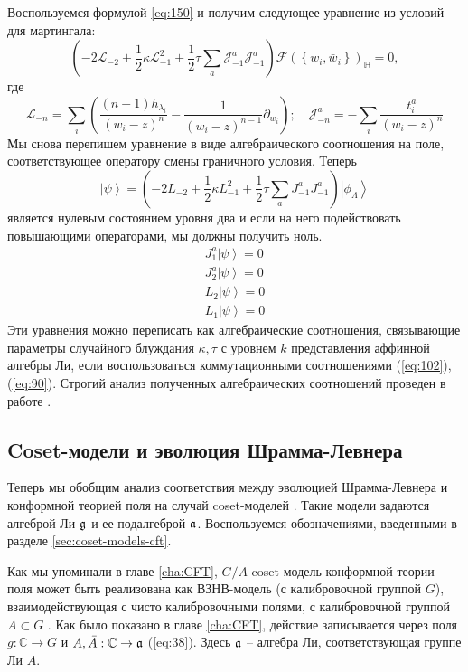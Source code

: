 Воспользуемся формулой \eqref{eq:150} и получим следующее уравнение из условий для мартингала:
\begin{equation}
  \left(-2 \mathcal{L}_{-2}+\frac{1}{2}\kappa \mathcal{L}_{-1}^{2}+\frac{1}{2}\tau\sum_{a} \mathcal{J}^{a}_{-1} \mathcal{J}^{a}_{-1}\right)        \mathcal{F}(\left\{w_{i}, \bar w_{i}\right\})_{\mathbb{H}}=0,
  \label{eq:167}
\end{equation}
где
\begin{equation*}
  \mathcal{L}_{-n}=\sum_{i}\left(\frac{(n-1)h_{\lambda_{i}}}{(w_{i}-z)^{n}}-\frac{1}{(w_{i}-z)^{n-1}}\partial_{w_{i}}\right);\quad \mathcal{J}^{a}_{{-n}}=-\sum_{i}\frac{t^{a}_{i}}{(w_{i}-z)^{n}}
\end{equation*}
Мы снова перепишем уравнение в виде алгебраического соотношения на поле, соответствующее оператору смены граничного условия. Теперь
\begin{equation}
  \left| \psi\right>=\left(-2 L_{-2}+\frac{1}{2}\kappa L_{-1}^{2}+\frac{1}{2}\tau\sum_{a} J^{a}_{-1} J^{a}_{-1}\right) \left|\phi_{\Lambda}\right>    
  \label{eq:16}
\end{equation}
является нулевым состоянием уровня два и если на него подействовать повышающими операторами, мы должны получить ноль.
\begin{eqnarray}
  J^{a}_{1} \left|\psi\right>=0\\
  J^{a}_{2}\left|\psi\right>=0\\
  L_{2}\left|\psi\right>=0\\
  L_{1}\left|\psi\right>=0
\end{eqnarray}
Эти уравнения можно переписать как алгебраические соотношения, связывающие параметры случайного блуждания $\kappa, \tau$ с уровнем  $k$ представления аффинной алгебры Ли, если воспользоваться коммутационными соотношениями  (\ref{eq:102}), (\ref{eq:90}). Строгий анализ полученных алгебраических соотношений проведен в работе \cite{alekseev2010sle}.

\subsection{Coset-модели и эволюция Шрамма-Левнера}
\label{sec:coset-models-sle}
Теперь мы обобщим анализ соответствия между эволюцией Шрамма-Левнера и конформной теорией поля на случай coset-моделей \cite{Goddard198588}. Такие модели задаются алгеброй Ли $\mathfrak{g}$ и ее подалгеброй $\mathfrak{a}$. Воспользуемся обозначениями, введенными в разделе \ref{sec:coset-models-cft}.

Как мы упоминали в главе \ref{cha:CFT}, $G/A$-coset модель конформной теории поля может быть реализована как ВЗНВ-модель (с калибровочной группой $G$), взаимодействующая с чисто калибровочными полями, с калибровочной группой $A\subset G$ \cite{gawdzki1988g,figueroa89equivalence}. Как было показано в главе \ref{cha:CFT}, действие записывается через поля  $g:\mathbb{C}\to G$ и $A,\bar A:\mathbb{C}\to \mathfrak{a}$ (\ref{eq:38}). Здесь $\mathfrak{a}$ -- алгебра Ли, соответствующая группе Ли $A$.

